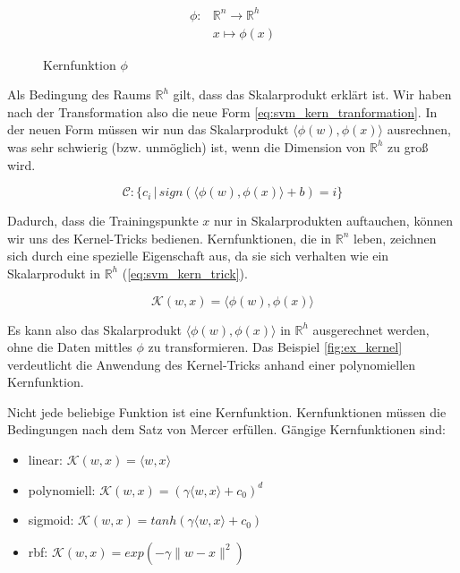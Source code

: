 \begin{equation}
\label{eq:svm_kernel_function}
\begin{split}
    \phi : & \mathbb{R}^n \to \mathbb{R}^h \\
    & x \mapsto \phi(x)
\end{split} 
\end{equation}

\begin{figure}[htbp] \centering
    \caption{Kernfunktion $\phi$}
    \label{fig:svm_kernel}
\end{figure}

Als Bedingung des Raums $\mathbb{R}^h$ gilt, dass das Skalarprodukt erklärt ist. 
Wir haben nach der Transformation also die neue Form \ref{eq:svm_kern_tranformation}. 
In der neuen Form müssen wir nun das Skalarprodukt $\langle\phi(w),\phi(x)\rangle$ ausrechnen, was sehr schwierig (bzw. unmöglich) ist, wenn die Dimension von $\mathbb{R}^h$ zu groß wird.

\begin{equation}
\label{eq:svm_kern_tranformation}
    \mathcal{C}: \{ c_i \,|\, sign(\langle \phi(w),\phi(x) \rangle + b) = i \}
\end{equation}


Dadurch, dass die Trainingspunkte $x$ nur in Skalarprodukten auftauchen, können wir uns des Kernel-Tricks bedienen.
Kernfunktionen, die in $\mathbb{R}^n$ leben, zeichnen sich durch eine spezielle Eigenschaft aus, da sie sich verhalten wie ein Skalarprodukt in $\mathbb{R}^h$ (\ref{eq:svm_kern_trick}). 

\begin{equation}
\label{eq:svm_kern_trick}
    \mathcal{K}(w,x) = \langle\phi(w),\phi(x)\rangle
\end{equation}

Es kann also das Skalarprodukt $\langle\phi(w),\phi(x)\rangle$ in $\mathbb{R}^h$ ausgerechnet werden, ohne die Daten mittles $\phi$ zu transformieren. 
Das Beispiel \ref{fig:ex_kernel} verdeutlicht die Anwendung des Kernel-Tricks  anhand einer polynomiellen Kernfunktion.

Nicht jede beliebige Funktion ist eine Kernfunktion. Kernfunktionen müssen die Bedingungen nach dem Satz von Mercer \cite[S. 127]{Marsland} erfüllen. 
Gängige Kernfunktionen sind:
\begin{itemize}
\item{linear: $\mathcal{K}(w,x) = \langle w,x \rangle$}
\item{polynomiell: $\mathcal{K}(w,x) = (\gamma\langle w,x \rangle+c_0)^d$}
\item{sigmoid: $\mathcal{K}(w,x) = tanh(\gamma\langle w,x \rangle+c_0)$}
\item{rbf: $\mathcal{K}(w,x) = exp(- \gamma \|w - x \| ^2)$}
\end{itemize}

